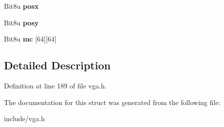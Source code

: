 \begin{DoxyCompactItemize}
\item 
\hypertarget{structVGA__HWCURSOR_abf50682342447c46dd13676cd0596281}{Bit8u {\bfseries posx}}\label{structVGA__HWCURSOR_abf50682342447c46dd13676cd0596281}

\item 
\hypertarget{structVGA__HWCURSOR_a436c666c0e7ef856d7ca98a6e5f30bd0}{Bit8u {\bfseries posy}}\label{structVGA__HWCURSOR_a436c666c0e7ef856d7ca98a6e5f30bd0}

\item 
\hypertarget{structVGA__HWCURSOR_a8c67327cfdedc8e3cb9a1a1d4d1d0e20}{Bit8u {\bfseries mc} \mbox{[}64\mbox{]}\mbox{[}64\mbox{]}}\label{structVGA__HWCURSOR_a8c67327cfdedc8e3cb9a1a1d4d1d0e20}

\end{DoxyCompactItemize}


\subsection{Detailed Description}


Definition at line 189 of file vga.\-h.



The documentation for this struct was generated from the following file\-:\begin{DoxyCompactItemize}
\item 
include/vga.\-h\end{DoxyCompactItemize}
